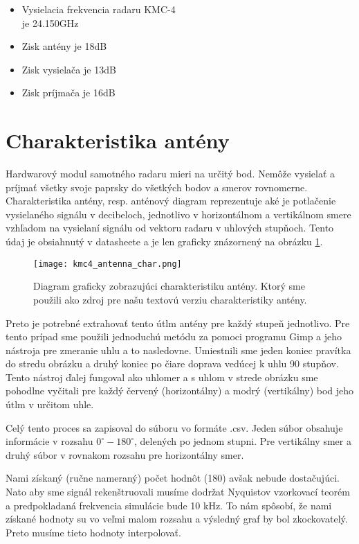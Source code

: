 \documentclass[slovak]{ExcelAtFIT} %
\begin{document}
  \begin{itemize}
    \item Vysielacia frekvencia radaru KMC-4\\ je 24.150GHz
    \item Zisk antény je 18dB
    \item Zisk vysielača je 13dB
    \item Zisk príjmača je 16dB
  \end{itemize}  

  \section{Charakteristika antény}
    \hspace{0.6cm}Hardwarový modul samotného radaru mieri na určitý bod. Nemôže vysielať a príjmať všetky svoje paprsky do všetkých bodov a smerov rovnomerne. Charakteristika antény, resp. anténový diagram repre\-zentuje aké je potlačenie vysielaného signálu v decibeloch, jednotlivo v horizontálnom a vertikálnom smere vzhľadom na vysielaní signálu od vektoru radaru v uhlových stupňoch. Tento údaj je obsiahnutý v data\-sheete a je len graficky znázornený na obrázku \ref{fig:kmc4_antenna_char}.
	\begin{figure}[t]
		\centering
		\texttt{[image: kmc4\_antenna\_char.png]}
		\caption{Diagram graficky zobrazujúci charakteristiku antény. Ktorý sme použili ako zdroj pre našu textovú verziu charakteristiky antény\cite{kmc4sheet}.}
		\label{fig:kmc4_antenna_char}
	\end{figure}

    Preto je potrebné extrahovať tento útlm antény pre každý stupeň jednotlivo. Pre tento prípad sme použili jednoduchú metódu za pomoci programu Gimp a jeho nástroja pre zmeranie uhlu a to nasledovne. Umiestnili sme jeden koniec pravítka do stredu obrázku a druhý koniec po čiare doprava vedúcej k uhlu 90 stupňov. Tento nástroj ďalej fungoval ako uhlomer a s uhlom v strede obrázku sme pohodlne vyčitali pre každý červený (horizontálny) a modrý (vertikálny) bod jeho útlm v určitom uhle.

    Celý tento proces sa zapisoval do súboru vo formáte .csv. Jeden súbor obsahuje informácie v rozsahu $0^{\circ}-180^{\circ}$, delených po jednom stupni. Pre vertikálny smer a druhý súbor v rovnakom rozsahu pre horizontálny smer.

    Nami získaný (ručne nameraný) počet hodnôt (180) avšak nebude dostačujúci. Nato aby sme signál reken\-štruovali musíme dodržat Nyquistov vzorkovací teorém a predpokladaná frekvencia simulácie bude 10 kHz. To nám spôsobí, že nami získané hodnoty su vo veľmi malom rozsahu a výsledný graf by bol zkockovatelý. Preto musíme tieto hodnoty interpolovať.
\end{document}
